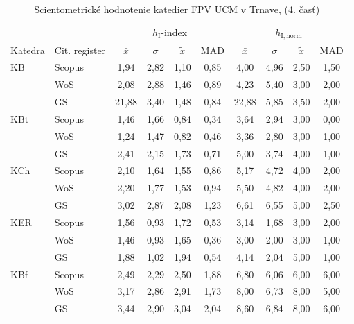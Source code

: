 {\begin{table}
  \centering\small
  \caption[Hodnotenie FPV\,--\,$h_{\mathrm{I}}$-index a $h_{\mathrm{I,norm}}$]{Scientometrické hodnotenie katedier FPV UCM v Trnave, (4. časť)}
\label{tab:4-staff.results}
\begin{tabularx}{\textwidth}{XXcccc@{\hspace{3ex}}cccc}
  \toprule\noalign{\vspace{.3ex}}
        &             & \multicolumn{4}{c}{$h_{\mathrm{I}}$-index}  & \multicolumn{4}{c}{$h_{\mathrm{I,norm}}$}  \\
Katedra & Cit. register& $\bar{x}$      & $\sigma$  & $\tilde{x}$ & MAD  & $\bar{x}$      & $\sigma$  & $\tilde{x}$  & MAD  \\[0.3ex]
  \midrule\noalign{\vspace{.5ex}}
 KB   & Scopus & 1,94     & 2,82 & 1,10 & 0,85 & 4,00    & 4,96 & 2,50 & 1,50 \\
      & WoS    & 2,08     & 2,88 & 1,46 & 0,89 & 4,23    & 5,40 & 3,00 & 2,00 \\
      & GS     & 21,88    & 3,40 & 1,48 & 0,84 & 22,88   & 5,85 & 3,50 & 2,00 \\[3ex]
 KBt  & Scopus & 1,46     & 1,66 & 0,84 & 0,34 & 3,64    & 2,94 & 3,00 & 0,00 \\
      & WoS    & 1,24     & 1,47 & 0,82 & 0,46 & 3,36    & 2,80 & 3,00 & 1,00 \\
      & GS     & 2,41     & 2,15 & 1,73 & 0,71 & 5,00    & 3,74 & 4,00 & 1,00 \\[3ex]
 KCh  & Scopus & 2,10     & 1,64 & 1,55 & 0,86 & 5,17    & 4,72 & 4,00 & 2,00 \\
      & WoS    & 2,20     & 1,77 & 1,53 & 0,94 & 5,50    & 4,82 & 4,00 & 2,00 \\
      & GS     & 3,02     & 2,87 & 2,08 & 1,23 & 6,61    & 6,55 & 5,00 & 2,50 \\[3ex]
 KER  & Scopus & 1,56     & 0,93 & 1,72 & 0,53 & 3,14    & 1,68 & 3,00 & 2,00 \\
      & WoS    & 1,46     & 0,93 & 1,65 & 0,36 & 3,00    & 2,00 & 3,00 & 1,00 \\
      & GS     & 1,88     & 1,02 & 1,94 & 0,54 & 4,14    & 2,04 & 5,00 & 1,00 \\[3ex]
 KBf  & Scopus & 2,49     & 2,29 & 2,50 & 1,88 & 6,80    & 6,06 & 6,00 & 6,00 \\
      & WoS    & 3,17     & 2,86 & 2,91 & 1,73 & 8,00    & 6,73 & 8,00 & 5,00 \\
      & GS     & 3,44     & 2,90 & 3,04 & 2,04 & 8,60    & 6,84 & 8,00 & 6,00 \\[3ex]

\end{tabularx}
\end{table}}
